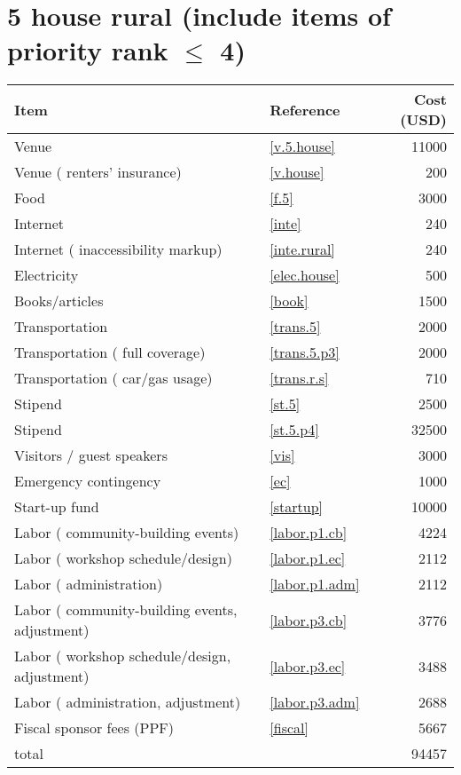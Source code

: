 \section*{5 house rural (include items of priority rank $\leq$ 4)}
\begin{center}
\begin{tabular}{llr}
Item & Reference & Cost (USD) \\ \hline
Venue & \ref{v.5.house} & 11000 \\
Venue ( renters' insurance) & \ref{v.house} & 200 \\
Food & \ref{f.5} & 3000 \\
Internet & \ref{inte} & 240 \\
Internet ( inaccessibility markup) & \ref{inte.rural} & 240 \\
Electricity & \ref{elec.house} & 500 \\
Books/articles & \ref{book} & 1500 \\
Transportation & \ref{trans.5} & 2000 \\
Transportation ( full coverage) & \ref{trans.5.p3} & 2000 \\
Transportation ( car/gas usage) & \ref{trans.r.s} & 710 \\
Stipend & \ref{st.5} & 2500 \\
Stipend & \ref{st.5.p4} & 32500 \\
Visitors / guest speakers & \ref{vis} & 3000 \\
Emergency contingency & \ref{ec} & 1000 \\
Start-up fund & \ref{startup} & 10000 \\
Labor ( community-building events) & \ref{labor.p1.cb} & 4224 \\
Labor ( workshop schedule/design) & \ref{labor.p1.ec} & 2112 \\
Labor ( administration) & \ref{labor.p1.adm} & 2112 \\
Labor ( community-building events, adjustment) & \ref{labor.p3.cb} & 3776 \\
Labor ( workshop schedule/design, adjustment) & \ref{labor.p3.ec} & 3488 \\
Labor ( administration, adjustment) & \ref{labor.p3.adm} & 2688 \\
Fiscal sponsor fees (PPF) & \ref{fiscal} & 5667 \\ \hline
total &  & 94457
\end{tabular}
\end{center}
\newpage

